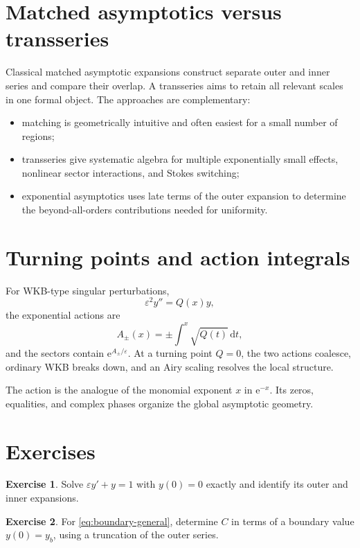 \documentclass[11pt,openany]{book}
\theoremstyle{definition}
\newtheorem{exercise}{Exercise}[chapter]
\theoremstyle{plain}
\theoremstyle{remark}
\newcommand{\eps}{\varepsilon}
\newcommand{\dd}{\,\mathrm{d}}
\newcommand{\e}{\mathrm{e}}
\begin{document}
\section{Matched asymptotics versus transseries}

Classical matched asymptotic expansions construct separate outer and inner series and compare their overlap. A transseries aims to retain all relevant scales in one formal object. The approaches are complementary:

\begin{itemize}
\item matching is geometrically intuitive and often easiest for a small number of regions;
\item transseries give systematic algebra for multiple exponentially small effects, nonlinear sector interactions, and Stokes switching;
\item exponential asymptotics uses late terms of the outer expansion to determine the beyond-all-orders contributions needed for uniformity.
\end{itemize}

\section{Turning points and action integrals}

For WKB-type singular perturbations,
\[
 \eps^2y''=Q(x)y,
\]
the exponential actions are
\[
 A_{\pm}(x)=\pm\int^x\sqrt{Q(t)}\dd t,
\]
and the sectors contain $\e^{A_\pm/\eps}$. At a turning point $Q=0$, the two actions coalesce, ordinary WKB breaks down, and an Airy scaling resolves the local structure.

The action is the analogue of the monomial exponent $x$ in $\e^{-x}$. Its zeros, equalities, and complex phases organize the global asymptotic geometry.

\section{Exercises}

\begin{exercise}
Solve $\eps y'+y=1$ with $y(0)=0$ exactly and identify its outer and inner expansions.
\end{exercise}

\begin{exercise}
For \cref{eq:boundary-general}, determine $C$ in terms of a boundary value $y(0)=y_b$, using a truncation of the outer series.
\end{exercise}
\end{document}
